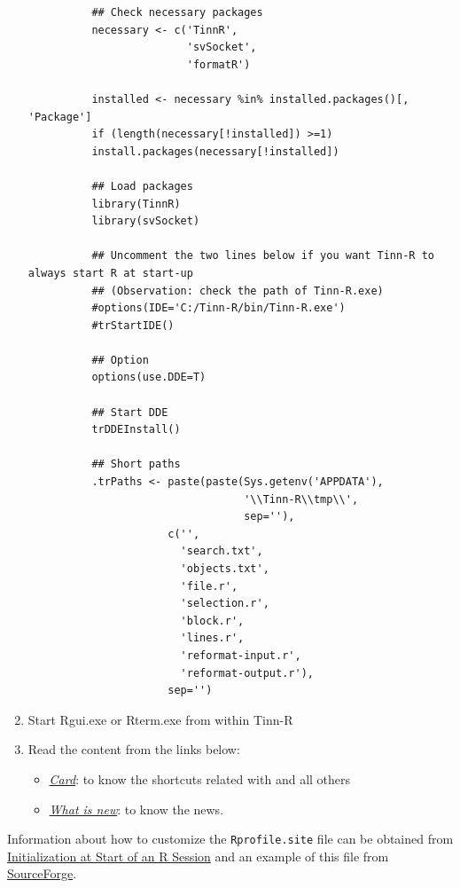 \begin{enumerate}
{{\begin{verbatim}
          ## Check necessary packages
          necessary <- c('TinnR',
                         'svSocket',
                         'formatR')

          installed <- necessary %in% installed.packages()[, 'Package']
          if (length(necessary[!installed]) >=1)
          install.packages(necessary[!installed])

          ## Load packages
          library(TinnR)
          library(svSocket)

          ## Uncomment the two lines below if you want Tinn-R to always start R at start-up
          ## (Observation: check the path of Tinn-R.exe)
          #options(IDE='C:/Tinn-R/bin/Tinn-R.exe')
          #trStartIDE()

          ## Option
          options(use.DDE=T)

          ## Start DDE
          trDDEInstall()

          ## Short paths
          .trPaths <- paste(paste(Sys.getenv('APPDATA'),
                                  '\\Tinn-R\\tmp\\',
                                  sep=''),
                      c('',
                        'search.txt',
                        'objects.txt',
                        'file.r',
                        'selection.r',
                        'block.r',
                        'lines.r',
                        'reformat-input.r',
                        'reformat-output.r'),
                      sep='')
        \end{verbatim}
      } %
    } %
  \item Start Rgui.exe or Rterm.exe from within Tinn-R
  \item Read the content from the links below:
    \begin{itemize}
      \item \textit{\href{\#basic\_card}{Card}}: to know
        the shortcuts related with \RR{} and all others
      \item \textit{\href{\#whatisnew}{What is new}}:
        to know the news.
    \end{itemize}
\end{enumerate}


Information about how to customize the \texttt{Rprofile.site} file can be obtained from
\href{http://stat.ethz.ch/R-manual/R-patched/library/base/html/Startup.html}{Initialization at Start of an R Session}
and an example of this file from \href{http://sourceforge.net/p/tinn-r/news/?source=navbar}{SourceForge}.



